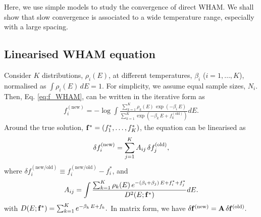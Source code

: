 \documentclass{gMOS2e}
\begin{document}

Here, we use simple models
to study the convergence of direct WHAM.
%
We shall show that
slow convergence is
associated to a wide temperature range,
especially with a large spacing.





\subsection{Linearised WHAM equation}



Consider $K$ distributions, $\rho_i(E)$,
at different temperatures,
$\beta_i$ ($i = 1, \dots, K$),
%
normalised as
%
$
\int \rho_i(E) \, dE = 1.
$
%
%
%
For simplicity,
we assume equal sample sizes, $N_i$.
%
Then,
Eq. \eqref{eq:f_WHAM},
can be written
in the iterative form as
%
\begin{align}
f_i^\mathrm{(new)}
=
-\log
\int
\frac
{
  \sum_{k=1}^K \rho_k(E) \, \exp(-\beta_i \, E)
}
{
  \sum_{k=1}^K
  \exp(
    -\beta_k \, E + f_k^\mathrm{(old)}
  )
}
dE.
\label{eq:f_WHAM1}
\end{align}
%
Around the true solution,
$\mathbf{f}^* = (f_1^*, \dots, f_K^*)$,
the equation can be linearised as
%
\begin{align}
\delta f_i^\mathrm{(new)}
=
\sum_{j = 1}^K
A_{ij} \,
\delta f_j^\mathrm{(old)},
\notag
\end{align}
%
where
%
$\delta f_i^\mathrm{(new/old)}
\equiv f_i^\mathrm{(new/old)} - f_i^*$,
%
and
\begin{align}
  A_{ij}
=
\int
\frac
{
  \sum_{k=1}^K \rho_k(E) \,
    e^{
      -(\beta_i + \beta_j) \, E + f_i^* + f_j^*
    }
}
{
  D^2(E; \mathbf{f}^*)
}
dE.
\label{eq:Aij}
\end{align}
%
with
$
D(E; \mathbf{f}^*)
=
\sum_{k = 1}^K
  e^{
    -\beta_k \, E + f_k
  }.
$
%
In matrix form, we have
%
$
\delta \mathbf{f}^\mathrm{(new)}
=
\mathbf{A} \,
\delta \mathbf{f}^\mathrm{(old)}.
$
\end{document}
